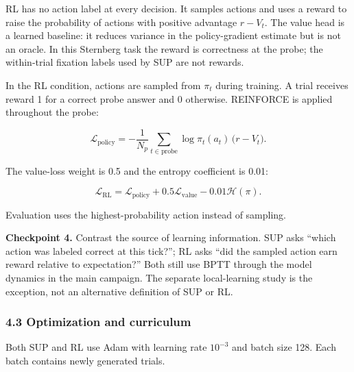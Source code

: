 \documentclass[
  10pt,
]{article}
\begin{document}
RL has no action label at every decision. It samples actions and uses a
reward to raise the probability of actions with positive advantage
\(r-V_t\). The value head is a learned baseline: it reduces variance in
the policy-gradient estimate but is not an oracle. In this Sternberg
task the reward is correctness at the probe; the within-trial fixation
labels used by SUP are not rewards.

In the RL condition, actions are sampled from \(\pi_t\) during training.
A trial receives reward 1 for a correct probe answer and 0 otherwise.
REINFORCE is applied throughout the probe:

\[
\mathcal L_{\mathrm{policy}}
=
-\frac{1}{N_p}
\sum_{t\in\mathrm{probe}}
\log\pi_t(a_t)\,
\bigl(r-V_t\bigr).
\]

The value-loss weight is 0.5 and the entropy coefficient is 0.01:

\[
\mathcal L_{\mathrm{RL}}
=
\mathcal L_{\mathrm{policy}}
+0.5\mathcal L_{\mathrm{value}}
-0.01\mathcal H(\pi).
\]

Evaluation uses the highest-probability action instead of sampling.

\textbf{Checkpoint 4.} Contrast the source of learning information. SUP
asks ``which action was labeled correct at this tick?''; RL asks ``did
the sampled action earn reward relative to expectation?'' Both still use
BPTT through the model dynamics in the main campaign. The separate
local-learning study is the exception, not an alternative definition of
SUP or RL.

\hypertarget{optimization-and-curriculum}{%
\subsubsection{4.3 Optimization and
curriculum}\label{optimization-and-curriculum}}

Both SUP and RL use Adam with learning rate \(10^{-3}\) and batch size
128. Each batch contains newly generated trials.
\end{document}
